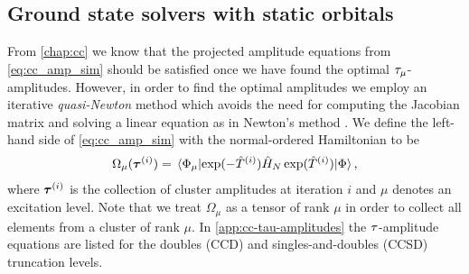         \subsection{Ground state solvers with static orbitals}
            From \autoref{chap:cc} we know that the projected amplitude
            equations from \autoref{eq:cc_amp_sim} should be satisfied once we
            have found the optimal $\tau_{\mu}$-amplitudes.
            However, in order to find the optimal amplitudes we employ an
            iterative \emph{quasi-Newton} method which avoids the need for
            computing the Jacobian matrix and solving a linear equation as in
            Newton's method \cite{helgaker-molecular}.
            We define the left-hand side of \autoref{eq:cc_amp_sim} with the
            normal-ordered Hamiltonian to be
            \begin{align}
                \Omega_{\mu}(\vfg{\clustamp}^{(i)})
                = \mel*{\slat_{\mu}}{
                    \exponential(-\clust^{(i)})
                    \hamil_N
                    \exponential(\clust^{(i)})
                }{\slat},
            \end{align}
            where $\boldsymbol{\tau}^{(i)}$ is the collection of cluster
            amplitudes at iteration $i$ and $\mu$ denotes an excitation level.
            Note that we treat $\Omega_{\mu}$ as a tensor of rank $\mu$ in
            order to collect all elements from a cluster of rank $\mu$.
            In \autoref{app:cc-tau-amplitudes} the $\tau$-amplitude
            equations are listed for the doubles (CCD) and singles-and-doubles
            (CCSD) truncation levels.

